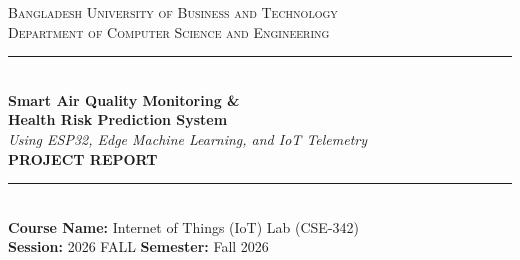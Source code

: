 \documentclass[12pt,journal,onecolumn,a4paper]{IEEEtran}
\begin{document}
\begin{titlepage}
    
    \begin{center}
        \vspace*{1.5cm}
        
        \textsc{\LARGE Bangladesh University of Business and Technology}\\[0.5cm]
        \textsc{\large Department of Computer Science and Engineering}\\[0.5cm]
        \rule{0.8\textwidth}{1pt}\\[1.5cm]
        
        {\Huge \textbf{Smart Air Quality Monitoring \&}}\\[0.3cm]
        {\Huge \textbf{Health Risk Prediction System}}\\[1.5cm]
        
        {\Large \textit{Using ESP32, Edge Machine Learning, and IoT Telemetry}}\\[1.5cm]
        
        \textbf{\LARGE PROJECT REPORT}\\[1.5cm]
        
        \rule{0.8\textwidth}{1pt}\\[0.8cm]
        
        {\large \textbf{Course Name:} Internet of Things (IoT) Lab (CSE-342)}\\[0.2cm]
        {\large \textbf{Session:} 2026 FALL \hspace{1cm} \textbf{Semester:} Fall 2026}\\[1.5cm]
        

\end{center}
\end{titlepage}
\end{document}
